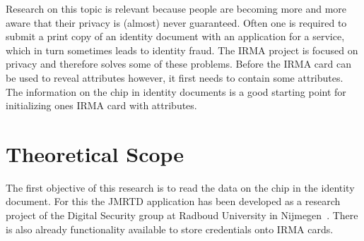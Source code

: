 \documentclass[a4paper, oneside]{scrartcl}
\begin{document}
Research on this topic is relevant because people are becoming more and more aware that their privacy is (almost) never guaranteed. Often one is required to submit a print copy of an identity document with an application for a service, which in turn sometimes leads to identity fraud. The IRMA project is focused on privacy and therefore solves some of these problems. Before the IRMA card can be used to reveal attributes however, it first needs to contain some attributes. The information on the chip in identity documents is a good starting point for initializing ones IRMA card with attributes.

\section{Theoretical Scope}




The first objective of this research is to read the data on the chip in the identity document. For this the JMRTD application has been developed as a research project of the Digital Security group at Radboud University in Nijmegen~\cite{sosgroup2007radboud}. There is also already functionality available to store credentials onto IRMA cards. 
\end{document}
